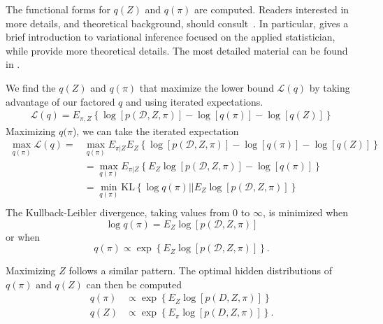 \documentclass[12pt]{article}
\def\l{\left}
\def\r{\right}
\begin{document}
The functional forms for $q(Z)$ and $q(\pi)$ are computed.
Readers interested in more details, and theoretical background, should consult~\cite{rustagi1976variational,blei2017variational,bishop2006pattern,murphy2012machine}.
In particular, \cite{blei2017variational} gives a brief introduction to variational inference focused on the applied statistician, while \cite{bishop2006pattern,murphy2012machine} provide more theoretical details. 
The most detailed material can be found in \cite{rustagi1976variational}.

We find the $q(Z)$ and $q(\pi)$ that maximize the lower bound $\mathcal{L}(q)$ by taking advantage of our factored $q$ and using iterated expectations.
\begin{align}
  \mathcal{L}(q) = E_{\pi,Z} \l\{ \log\l[p(\mathcal{D},Z,\pi)\r] - \log[q(\pi)] - \log[q(Z)]\r\}
\end{align}
Maximizing $q(\pi$), we can take the iterated expectation
\begin{align*}
  \max_{q(\pi)} \mathcal{L}(q) =  &\max_{q(\pi)} E_{\pi|Z} E_{Z} \l\{ \log\l[p(\mathcal{D},Z,\pi)\r] - \log[q(\pi)] - \log[q(Z)]\r\}\\
  &=\max_{q(\pi)} E_{\pi|Z}  \l\{ E_{Z}\log\l[p(\mathcal{D},Z,\pi)\r] - \log[q(\pi)]\r\}\\
  &=\min_{q(\pi)} \text{KL}\l\{ \log q(\pi) ||  E_{Z}\log\l[p(\mathcal{D},Z,\pi)\r] \r\}\\
\end{align*}
The Kullback-Leibler divergence, taking values from 0 to $\infty$, is minimized when
\begin{equation*}
    \log q(\pi) = E_{Z}\log\l[p(\mathcal{D},Z,\pi)\r]
\end{equation*}
or when 
\begin{equation*}
   q(\pi) \propto \exp\l\{E_{Z}\log\l[p(\mathcal{D},Z,\pi)\r]\r\}.   
\end{equation*}

Maximizing $Z$ follows a similar pattern.
The optimal hidden distributions of $q(\pi)$ and $q(Z)$ can then be computed
\begin{align*}
  q(\pi) &\propto \exp\l\{E_{Z}\log\l[p(D,Z,\pi)\r]\r\}\\
  q(Z) &\propto \exp\l\{E_{\pi}\log\l[p(D,Z,\pi)\r]\r\}.
\end{align*}
\end{document}
